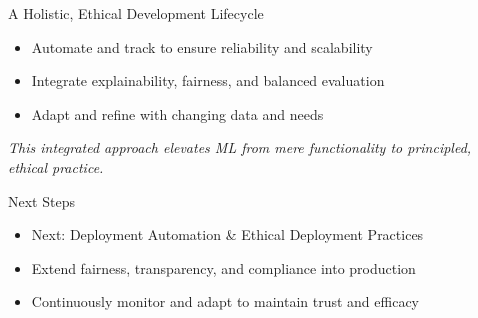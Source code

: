\documentclass[aspectratio=169]{beamer}
\begin{document}

\begin{frame}{A Holistic, Ethical Development Lifecycle}
\begin{itemize}
\item Automate and track to ensure reliability and scalability
\item Integrate explainability, fairness, and balanced evaluation
\item Adapt and refine with changing data and needs
\end{itemize}

\emph{This integrated approach elevates ML from mere functionality to principled, ethical practice.}
\end{frame}


\begin{frame}{Next Steps}
\begin{itemize}
\item Next: Deployment Automation \& Ethical Deployment Practices
\item Extend fairness, transparency, and compliance into production
\item Continuously monitor and adapt to maintain trust and efficacy
\end{itemize}
\end{frame}
\end{document}

